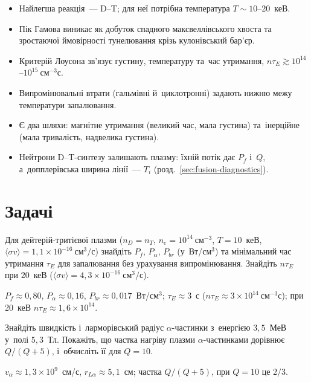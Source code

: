 \begin{Summary}
\begin{itemize}
\item Найлегша реакція~--- D--T; для неї потрібна температура $T\sim10$--$20$~кеВ.
\item Пік Гамова виникає як добуток спадного максвеллівського хвоста та зростаючої ймовірності тунелювання крізь кулонівський бар'єр.
\item Критерій Лоусона зв'язує густину, температуру та~час утримання, $n\tau_E\gtrsim10^{14}$--$10^{15}~\mathrm{см}^{-3}\mathrm{с}$.
\item Випромінювальні втрати (гальмівні й~циклотронні) задають нижню межу температури запалювання.
\item Є два шляхи: магнітне утримання (великий час, мала густина) та~інерційне (мала тривалість, надвелика густина).
\item Нейтрони D--T-синтезу залишають плазму: їхній потік дає $P_f$ і~$Q$, а~допплерівська ширина лінії~--- $T_i$ (розд.~\ref{sec:fusion-diagnostics}).
\end{itemize}
\end{Summary}

\section*{Задачі}

\begin{problem}\label{prb:PlasmaFusion}
	Для дейтерій-тритієвої плазми ($n_D=n_T$, $n_e=10^{14}~\mathrm{см}^{-3}$, $T=10$~кеВ, $\langle\sigma v\rangle=1{,}1\times10^{-16}~\mathrm{см}^3/\mathrm{с}$)
	знайдіть $P_f$, $P_\alpha$, $P_{br}$ (у~Вт/$\mathrm{см}^3$) та мінімальний час
	утримання $\tau_E$ для запалювання без урахування випромінювання. Знайдіть $n\tau_E$
	при $20$~кеВ ($\langle\sigma v\rangle=4{,}3\times10^{-16}~\mathrm{см}^3/\mathrm{с}$).
	\begin{solution}
		$P_f\approx0{,}80$, $P_\alpha\approx0{,}16$, $P_{br}\approx0{,}017$~Вт/см$^3$; $\tau_E\approx3$~с ($n\tau_E\approx3\times10^{14}~\mathrm{см}^{-3}\mathrm{с}$); при 20~кеВ $n\tau_E\approx1{,}6\times10^{14}$.
	\end{solution}
\end{problem}

\begin{problem}\label{prb:AlphaHeating}
	Знайдіть швидкість і~ларморівський радіус $\alpha$-частинки з~енергією $3{,}5$~МеВ
	у~полі $5{,}3$~Тл. Покажіть, що частка нагріву плазми $\alpha$-частинками дорівнює
	$Q/(Q+5)$, і~обчисліть її для $Q=10$.
	\begin{solution}
		$v_\alpha\approx1{,}3\times10^{9}$~см/с, $r_{L\alpha}\approx5{,}1$~см; частка $Q/(Q+5)$, при $Q=10$ це $2/3$.
	\end{solution}
\end{problem}

